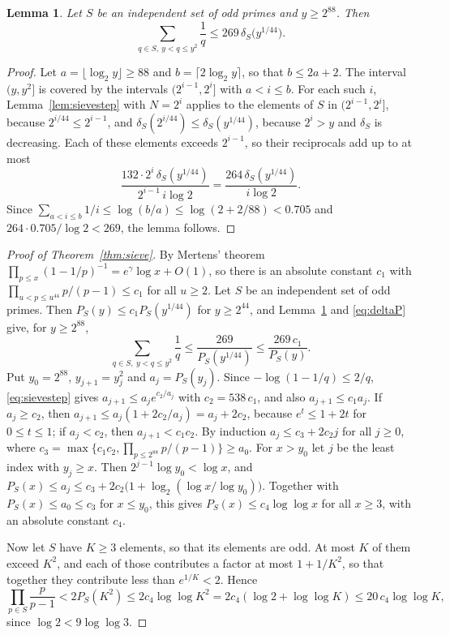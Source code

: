 \documentclass[screen,reqno]{aomart}
\numberwithin{equation}{section}
\theoremstyle{plain}
\newtheorem{lemma}[theorem]{Lemma}
\theoremstyle{definition}
\theoremstyle{remark}
\begin{document}
\begin{lemma}\label{lem:sievesum}
Let $S$ be an independent set of odd primes and $y\ge2^{88}$. Then
\[
  \sum_{q\in S,\ y<q\le y^2}\frac1q\le269\,\delta_S\bigl(y^{1/44}\bigr).
\]
\end{lemma}

\begin{proof}
Let $a=\lfloor\log_2y\rfloor\ge88$ and $b=\lceil2\log_2y\rceil$, so
that $b\le2a+2$. The interval $(y,y^2]$ is covered by the intervals
$(2^{i-1},2^i]$ with $a<i\le b$. For each such $i$,
Lemma~\ref{lem:sievestep} with $N=2^i$ applies to the elements of $S$
in $(2^{i-1},2^i]$, because $2^{i/44}\le2^{i-1}$, and
$\delta_S(2^{i/44})\le\delta_S(y^{1/44})$, because $2^i>y$ and
$\delta_S$ is decreasing. Each of these elements exceeds $2^{i-1}$, so
their reciprocals add up to at most
\[
  \frac{132\cdot2^i\,\delta_S(y^{1/44})}{2^{i-1}\,i\log2}
  =\frac{264\,\delta_S(y^{1/44})}{i\log2}.
\]
Since $\sum_{a<i\le b}1/i\le\log(b/a)\le\log(2+2/88)<0.705$ and
$264\cdot0.705/\log2<269$, the lemma follows.
\end{proof}

\begin{proof}[Proof of Theorem~\ref{thm:sieve}]
By Mertens' theorem $\prod_{p\le x}(1-1/p)^{-1}=e^{\gamma}\log x+O(1)$,
so there is an absolute constant $c_1$ with
$\prod_{u<p\le u^{44}}p/(p-1)\le c_1$ for all $u\ge2$. Let $S$ be an
independent set of odd primes. Then $P_S(y)\le c_1P_S(y^{1/44})$ for
$y\ge2^{44}$, and
Lemma~\ref{lem:sievesum} and \eqref{eq:deltaP} give, for $y\ge2^{88}$,
\begin{equation}\label{eq:sievestep}
  \sum_{q\in S,\ y<q\le y^2}\frac1q\le\frac{269}{P_S(y^{1/44})}
  \le\frac{269\,c_1}{P_S(y)} .
\end{equation}
Put $y_0=2^{88}$, $y_{j+1}=y_j^2$ and $a_j=P_S(y_j)$. Since
$-\log(1-1/q)\le2/q$, \eqref{eq:sievestep} gives
$a_{j+1}\le a_je^{c_2/a_j}$ with $c_2=538\,c_1$, and also
$a_{j+1}\le c_1a_j$. If $a_j\ge c_2$, then
$a_{j+1}\le a_j(1+2c_2/a_j)=a_j+2c_2$, because $e^t\le1+2t$ for
$0\le t\le1$; if $a_j<c_2$, then $a_{j+1}<c_1c_2$. By induction
$a_j\le c_3+2c_2j$ for all $j\ge0$, where
$c_3=\max\bigl\{c_1c_2,\prod_{p\le2^{88}}p/(p-1)\bigr\}\ge a_0$. For $x>y_0$
let $j$ be the least index with $y_j\ge x$. Then
$2^{j-1}\log y_0<\log x$, and
$P_S(x)\le a_j\le c_3+2c_2\bigl(1+\log_2(\log x/\log y_0)\bigr)$.
Together with $P_S(x)\le a_0\le c_3$ for $x\le y_0$, this gives
$P_S(x)\le c_4\log\log x$ for all $x\ge3$, with an absolute constant
$c_4$.

Now let $S$ have $K\ge3$ elements, so that its elements are odd. At
most $K$ of them exceed $K^2$, and each of those contributes a factor
at most $1+1/K^2$, so that together they contribute less than
$e^{1/K}<2$. Hence
\[
  \prod_{p\in S}\frac p{p-1}<2P_S(K^2)\le2c_4\log\log K^2
  =2c_4(\log2+\log\log K)\le20\,c_4\log\log K,
\]
since $\log2<9\log\log3$.
\end{proof}
\end{document}
